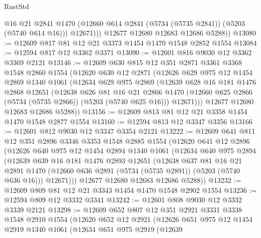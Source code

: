 \begin{lexlean}{RustStd}
\begin{coremodule}
              @16
              @21
              @2841
              @1470
              (@12660 @614 @2841 (@5734 (@5735 @2841)) (@5203 (@5740 @614 @16)))
              @12671)))
        @12677
        @12680
        @12683
        @12686
        @5288))
@13080 := @12609 @817 @81 @12 @21 @3373 @1454 @1470 @1548 @2852 @1554
@13084 := @12594 @817 @12 @3362 @3371
@13090 := @12601 @816 @9030 @12 @3362 @3369 @2121
@13146 := @12609
    @630
    @815
    @12
    @351
    @2871
    @3361
    @3368
    @1548
    @2860
    @1554
    (@12620
      @630
      @12
      @2871
      (@12626
        @629
        @975
        @12
        @1454
        @2869
        @1340
        @1061
        (@12634
          @629
          @975
          @2869
          (@12639
            @628
            @16
            @181
            @1476
            @2868
            @12651
            (@12638
              @626
              @81
              @16
              @21
              @2866
              @1470
              (@12660 @625 @2866 (@5734 (@5735 @2866)) (@5203 (@5740 @625 @16)))
              @12671)))
        @12677
        @12680
        @12683
        @12686
        @5288))
@13156 := @12609 @813 @81 @12 @21 @3358 @1454 @1470 @1548 @2877 @1554
@13160 := @12594 @813 @12 @3347 @3356
@13166 := @12601 @812 @9030 @12 @3347 @3354 @2121
@13222 := @12609
    @641
    @811
    @12
    @351
    @2896
    @3346
    @3353
    @1548
    @2885
    @1554
    (@12620
      @641
      @12
      @2896
      (@12626
        @640
        @975
        @12
        @1454
        @2894
        @1340
        @1061
        (@12634
          @640
          @975
          @2894
          (@12639
            @639
            @16
            @181
            @1476
            @2893
            @12651
            (@12638
              @637
              @81
              @16
              @21
              @2891
              @1470
              (@12660 @636 @2891 (@5734 (@5735 @2891)) (@5203 (@5740 @636 @16)))
              @12671)))
        @12677
        @12680
        @12683
        @12686
        @5288))
@13232 := @12609 @809 @81 @12 @21 @3343 @1454 @1470 @1548 @2902 @1554
@13236 := @12594 @809 @12 @3332 @3341
@13242 := @12601 @808 @9030 @12 @3332 @3339 @2121
@13298 := @12609
    @652
    @807
    @12
    @351
    @2921
    @3331
    @3338
    @1548
    @2910
    @1554
    (@12620
      @652
      @12
      @2921
      (@12626
        @651
        @975
        @12
        @1454
        @2919
        @1340
        @1061
        (@12634
          @651
          @975
          @2919
          (@12639

\end{coremodule}
\end{lexlean}
